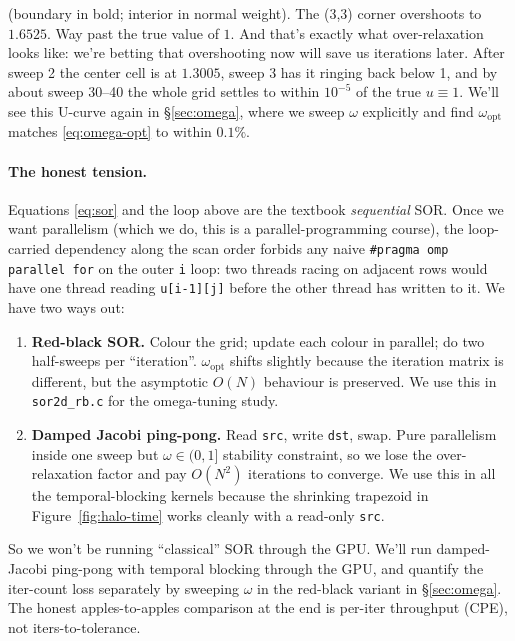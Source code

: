 \documentclass[11pt]{article}
\begin{document}
\noindent (boundary in bold; interior in normal weight).  The (3,3)
corner overshoots to $1.6525$. Way past the true value of $1$. And
that's exactly what over-relaxation looks like: we're betting that
overshooting now will save us iterations later.  After sweep 2 the
center cell is at $1.3005$, sweep 3 has it ringing back below 1, and
by about sweep 30--40 the whole grid settles to within $10^{-5}$ of
the true $u{\equiv}1$.  We'll see this U-curve again in
§\ref{sec:omega}, where we sweep $\omega$ explicitly and find
$\omega_{\text{opt}}$ matches \eqref{eq:omega-opt} to within
$0.1\%$.

\paragraph{The honest tension.}  Equations \eqref{eq:sor} and the
loop above are the textbook \emph{sequential} SOR.  Once we want
parallelism (which we do, this is a parallel-programming course), the
loop-carried dependency along the scan order forbids any naive
\texttt{\#pragma omp parallel for} on the outer \texttt{i} loop: two
threads racing on adjacent rows would have one thread reading
\texttt{u[i-1][j]} before the other thread has written to it.  We
have two ways out:

\begin{enumerate}[leftmargin=1.4em,itemsep=2pt,topsep=2pt]
  \item \textbf{Red-black SOR.}  Colour the grid; update each colour
        in parallel; do two half-sweeps per ``iteration''.
        $\omega_{\text{opt}}$ shifts slightly because the iteration
        matrix is different, but the asymptotic $O(N)$ behaviour is
        preserved.  We use this in \texttt{sor2d\_rb.c} for the
        omega-tuning study.
  \item \textbf{Damped Jacobi ping-pong.}  Read \texttt{src}, write
        \texttt{dst}, swap.  Pure parallelism inside one sweep but
        $\omega \in (0, 1]$ stability constraint, so we lose the
        over-relaxation factor and pay $O(N^2)$ iterations to
        converge.  We use this in all the temporal-blocking kernels
        because the shrinking trapezoid in
        Figure~\ref{fig:halo-time} works cleanly with a read-only
        \texttt{src}.
\end{enumerate}

\noindent So we won't be running ``classical'' SOR through the GPU.
We'll run damped-Jacobi ping-pong with temporal blocking through the
GPU, and quantify the iter-count loss separately by sweeping $\omega$
in the red-black variant in §\ref{sec:omega}.  The honest
apples-to-apples comparison at the end is per-iter throughput
(CPE), not iters-to-tolerance.
\end{document}
